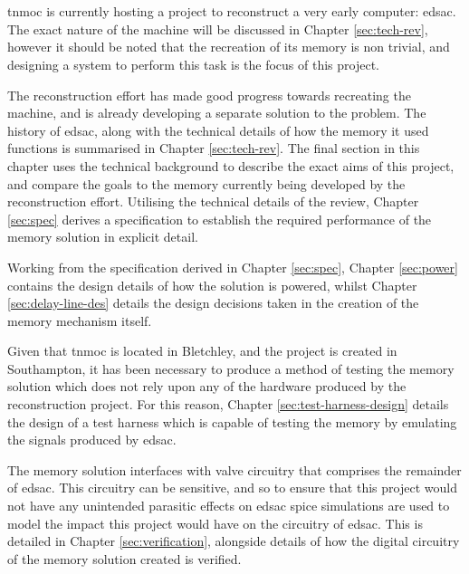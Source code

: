 
\chapter{} \label{sec:intro}
\gls{tnmoc} is currently hosting a project to reconstruct a very early computer: \gls{edsac}. The exact nature of the machine will be discussed in Chapter \ref{sec:tech-rev}, however it should be noted that the recreation of its memory is non trivial, and designing a system to perform this task is the focus of this project.

The reconstruction effort has made good progress towards recreating the machine, and is already developing a separate solution to the problem. The history of \gls{edsac}, along with the technical details of how the memory it used functions is summarised in Chapter \ref{sec:tech-rev}. The final section in this chapter uses the technical background to describe the exact aims of this project, and compare the goals to the memory currently being developed by the reconstruction effort. Utilising the technical details of the review, Chapter \ref{sec:spec} derives a specification to establish the required performance of the memory solution in explicit detail.

Working from the specification derived in Chapter \ref{sec:spec}, Chapter \ref{sec:power} contains the design details of how the solution is powered, whilst Chapter \ref{sec:delay-line-des} details the design decisions taken in the creation of the memory mechanism itself.

Given that \gls{tnmoc} is located in Bletchley, and the project is created in Southampton, it has been necessary to produce a method of testing the memory solution which does not rely upon any of the hardware produced by the reconstruction project. For this reason, Chapter \ref{sec:test-harness-design} details the design of a test harness which is capable of testing the memory by emulating the signals produced by \gls{edsac}.

The memory solution interfaces with valve circuitry that comprises the remainder of \gls{edsac}. This circuitry can be sensitive, and so to ensure that this project would not have any unintended parasitic effects on \gls{edsac} \gls{spice} simulations are used to model the impact this project would have on the circuitry of \gls{edsac}. This is detailed in Chapter \ref{sec:verification}, alongside details of how the digital circuitry of the memory solution created is verified.

